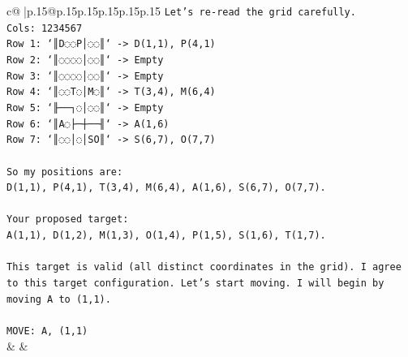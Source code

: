 \documentclass{article}
\begin{document}
{\begin{supertabular}{c@{$\;$}|p{.15\linewidth}@{}p{.15\linewidth}p{.15\linewidth}p{.15\linewidth}p{.15\linewidth}p{.15\linewidth}}
{{{\texttt{Let's re{-}read the grid carefully.} \\
\texttt{Cols: 1234567} \\
\texttt{Row 1: `║D◌◌P│◌◌║` {-}> D(1,1), P(4,1)} \\
\texttt{Row 2: `║◌◌◌◌│◌◌║` {-}> Empty} \\
\texttt{Row 3: `║◌◌◌◌│◌◌║` {-}> Empty} \\
\texttt{Row 4: `║◌◌T◌│M◌║` {-}> T(3,4), M(6,4)} \\
\texttt{Row 5: `╟──┐◌│◌◌║` {-}> Empty} \\
\texttt{Row 6: `║A◌├─┼──╢` {-}> A(1,6)} \\
\texttt{Row 7: `║◌◌│◌│SO║` {-}> S(6,7), O(7,7)} \\
\\ 
\texttt{So my positions are:} \\
\texttt{D(1,1), P(4,1), T(3,4), M(6,4), A(1,6), S(6,7), O(7,7).} \\
\\ 
\texttt{Your proposed target:} \\
\texttt{A(1,1), D(1,2), M(1,3), O(1,4), P(1,5), S(1,6), T(1,7).} \\
\\ 
\texttt{This target is valid (all distinct coordinates in the grid). I agree to this target configuration. Let's start moving. I will begin by moving A to (1,1).} \\
\\ 
\texttt{MOVE: A, (1,1)} \\
            }
        }
    }
    & & \\ \\


\end{supertabular}}
\end{document}

